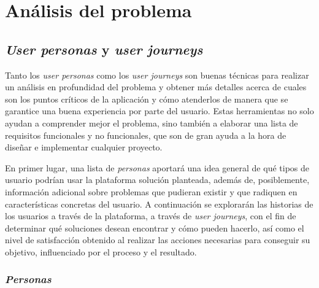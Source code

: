 \chapter{Análisis del problema}

\section{\textit{User personas} y \textit{user journeys}}

Tanto los \textit{user personas} como los \textit{user journeys} son buenas técnicas para realizar un análisis en profundidad del problema y obtener más detalles acerca de cuales son los puntos críticos de la aplicación y cómo atenderlos de manera que se garantice una buena experiencia por parte del usuario. Estas herramientas no solo ayudan a comprender mejor el problema, sino también a elaborar una lista de requisitos funcionales y no funcionales, que son de gran ayuda a la hora de diseñar e implementar cualquier proyecto.

En primer lugar, una lista de \textit{personas} aportará una idea general de qué tipos de usuario podrían usar la plataforma solución planteada, además de, posiblemente, información adicional sobre problemas que pudieran existir y que radiquen en características concretas del usuario. A continuación se explorarán las historias de los usuarios a través de la plataforma, a través de \textit{user journeys}, con el fin de determinar qué soluciones desean encontrar y cómo pueden hacerlo, así como el nivel de satisfacción obtenido al realizar las acciones necesarias para conseguir su objetivo, influenciado por el proceso y el resultado. 

\subsection{\textit{Personas}}

